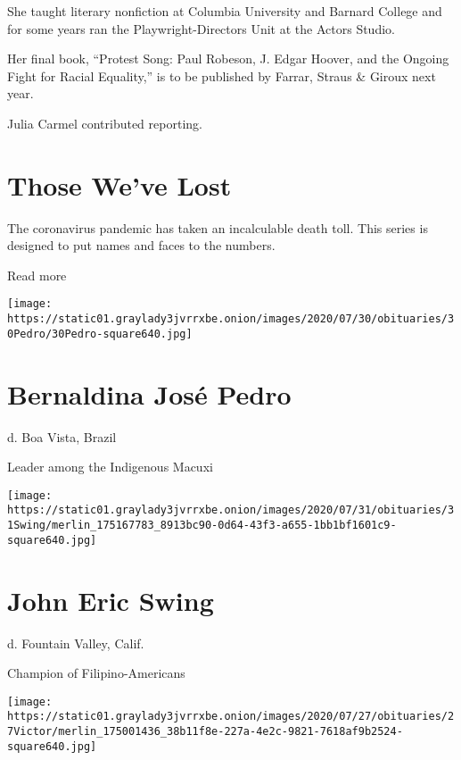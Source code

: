 She taught literary nonfiction at Columbia University and Barnard
College and for some years ran the Playwright-Directors Unit at the
Actors Studio.

Her final book, ``Protest Song: Paul Robeson, J. Edgar Hoover, and the
Ongoing Fight for Racial Equality,'' is to be published by Farrar,
Straus \& Giroux next year.

Julia Carmel contributed reporting.

\href{https://www.nytimes3xbfgragh.onion/interactive/2020/obituaries/people-died-coronavirus-obituaries.html?action=click\&pgtype=Article\&state=default\&region=BELOW_MAIN_CONTENT\&context=covid_obits_promo}{}

\hypertarget{those-weve-lost}{%
\section{Those We've Lost}\label{those-weve-lost}}

The coronavirus pandemic has taken an incalculable death toll. This
series is designed to put names and faces to the numbers.

Read more

\texttt{[image: https://static01.graylady3jvrrxbe.onion/images/2020/07/30/obituaries/30Pedro/30Pedro-square640.jpg]}

\hypertarget{bernaldina-josuxe9-pedro}{%
\section{Bernaldina José Pedro}\label{bernaldina-josuxe9-pedro}}

d. Boa Vista, Brazil

Leader among the Indigenous Macuxi

\texttt{[image: https://static01.graylady3jvrrxbe.onion/images/2020/07/31/obituaries/31Swing/merlin\_175167783\_8913bc90-0d64-43f3-a655-1bb1bf1601c9-square640.jpg]}

\hypertarget{john-eric-swing}{%
\section{John Eric Swing}\label{john-eric-swing}}

d. Fountain Valley, Calif.

Champion of Filipino-Americans

\texttt{[image: https://static01.graylady3jvrrxbe.onion/images/2020/07/27/obituaries/27Victor/merlin\_175001436\_38b11f8e-227a-4e2c-9821-7618af9b2524-square640.jpg]}

